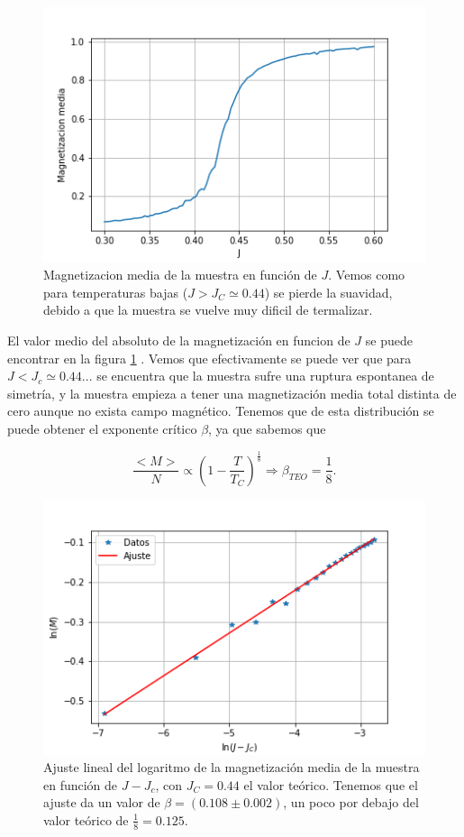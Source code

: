 \documentclass[
 reprint,
 amsmath,amssymb,
 aps,
]{revtex4-1}
\begin{document}
\begin{figure}
  \includegraphics[width=1.0\columnwidth]{images/magnetization_vs_j.png}
  \caption{Magnetizacion media de la muestra en funci\'on de $J$. Vemos como
    para temperaturas bajas ($J > J_C \simeq 0.44$) se pierde la suavidad,
    debido a que la muestra se vuelve muy dificil de termalizar.}
  \label{magnetization_vs_j}
\end{figure}

El valor medio del absoluto de la magnetizaci\'on en funcion de $J$ se puede
encontrar en la figura \ref{magnetization_vs_j} . Vemos que efectivamente se
puede ver que para $J<J_c \simeq 0.44...$ se encuentra que la muestra sufre una
ruptura espontanea de simetr\'ia, y la muestra empieza a tener una
magnetizaci\'on media total distinta de cero aunque no exista campo magn\'etico.
Tenemos que de esta distribuci\'on se puede obtener el exponente cr\'itico
$\beta$, ya que sabemos que

$$\frac{<M>}{N} \propto (1 - \frac{T}{T_C})^\frac{1}{8} \Rightarrow
  \beta_{TEO} = \frac{1}{8}.$$

\begin{figure}
  \includegraphics[width=1.0\columnwidth]{images/ajuste_beta.png}
  \caption{Ajuste lineal del logaritmo de la magnetizaci\'on media de la
    muestra en funci\'on de $J - J_c$, con $J_C = 0.44$ el valor te\'orico.
    Tenemos que el ajuste da un valor de $\beta = (0.108 \pm 0.002)$, un poco
    por debajo del valor te\'orico de $\frac{1}{8} = 0.125$.}
  \label{ajuste_beta}
\end{figure}
\end{document}
